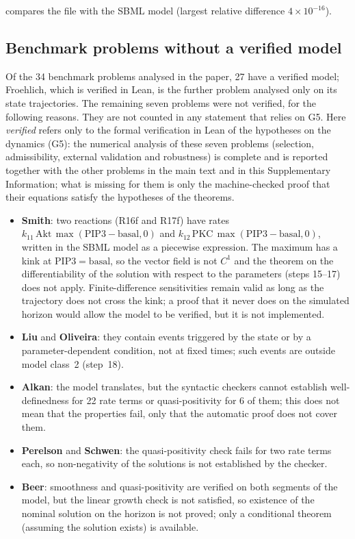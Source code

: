 compares the file with the SBML model (largest relative difference $4\times10^{-16}$).

\subsection*{Benchmark problems without a verified model}

Of the 34 benchmark problems analysed in the paper, 27 have a verified model; Froehlich, which is verified in Lean, is the further problem analysed only on its state trajectories. The remaining seven problems were not verified, for the following reasons. They are not counted in any statement that relies on G5. Here \emph{verified} refers only to the formal verification in Lean of the hypotheses on the dynamics (G5): the numerical analysis of these seven problems (selection, admissibility, external validation and robustness) is complete and is reported together with the other problems in the main text and in this Supplementary Information; what is missing for them is only the machine-checked proof that their equations satisfy the hypotheses of the theorems.

\begin{itemize}\itemsep0pt\small
\item \textbf{Smith}: two reactions (R16f and R17f) have rates $k_{11}\,\mathrm{Akt}\,\max(\mathrm{PIP3}-\mathrm{basal},0)$ and $k_{12}\,\mathrm{PKC}\,\max(\mathrm{PIP3}-\mathrm{basal},0)$, written in the SBML model as a piecewise expression. The maximum has a kink at $\mathrm{PIP3}=\mathrm{basal}$, so the vector field is not $C^1$ and the theorem on the differentiability of the solution with respect to the parameters (steps 15--17) does not apply. Finite-difference sensitivities remain valid as long as the trajectory does not cross the kink; a proof that it never does on the simulated horizon would allow the model to be verified, but it is not implemented.
\item \textbf{Liu} and \textbf{Oliveira}: they contain events triggered by the state or by a parameter-dependent condition, not at fixed times; such events are outside model class~2 (step~18).
\item \textbf{Alkan}: the model translates, but the syntactic checkers cannot establish well-definedness for 22 rate terms or quasi-positivity for 6 of them; this does not mean that the properties fail, only that the automatic proof does not cover them.
\item \textbf{Perelson} and \textbf{Schwen}: the quasi-positivity check fails for two rate terms each, so non-negativity of the solutions is not established by the checker.
\item \textbf{Beer}: smoothness and quasi-positivity are verified on both segments of the model, but the linear growth check is not satisfied, so existence of the nominal solution on the horizon is not proved; only a conditional theorem (assuming the solution exists) is available.
\end{itemize}


